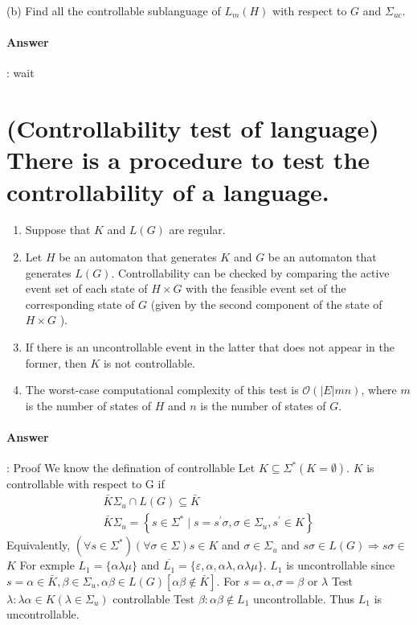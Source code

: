\documentclass{article}
\begin{document}
(b) Find all the controllable sublanguage of $L_m(H)$ with respect to $G$ and $\Sigma_{u c}$.

\paragraph{Answer}:
wait


\section{(Controllability test of language) There is a procedure to test the controllability of a language.}
\begin{enumerate}
  \item Suppose that $K$ and $L(G)$ are regular.
  \item Let $H$ be an automaton that generates $K$ and $G$ be an automaton that generates $L(G)$. Controllability can be checked by comparing the active event set of each state of $H \times G$ with the feasible event set of the corresponding state of $G$ (given by the second component of the state of $H \times G$ ).
  \item If there is an uncontrollable event in the latter that does not appear in the former, then $K$ is not controllable.
  \item The worst-case computational complexity of this test is $\mathcal{O}(|E| m n)$, where $m$ is the number of states of $H$ and $n$ is the number of states of $G$.
\end{enumerate}


\paragraph{Answer}:
Proof We know the defination of controllable Let $K \subseteq \Sigma^*(K=\emptyset)$. $K$ is controllable with respect to $\mathrm{G}$ if
$$
\begin{array}{r}
\bar{K} \Sigma_u \cap L(G) \subseteq \bar{K} \\
\bar{K} \Sigma_u=\left\{s \in \Sigma^* \mid s=s^{\prime} \sigma, \sigma \in \Sigma_u, s^{\prime} \in K\right\}
\end{array}
$$
Equivalently, $\left(\forall s \in \Sigma^*\right)(\forall \sigma \in \Sigma) s \in K$ and $\sigma \in \Sigma_u$ and $s \sigma \in L(G) \Rightarrow s \sigma \in$
$K$
For exmple $L_1=\{\alpha \lambda \mu\}$ and $\overline{L_1}=\{\varepsilon, \alpha, \alpha \lambda, \alpha \lambda \mu\}$. $L_1$ is uncontrollable since $s=\alpha \in \bar{K}, \beta \in \Sigma_u, \alpha \beta \in L(G)[\alpha \beta \notin \bar{K}]$. For $s=\alpha, \sigma=\beta$ or $\lambda$
Test $\lambda: \lambda \alpha \in K\left(\lambda \in \Sigma_u\right)$ controllable
Test $\beta: \alpha \beta \notin L_1$ uncontrollable. Thus $L_1$ is uncontrollable.
\end{document}
